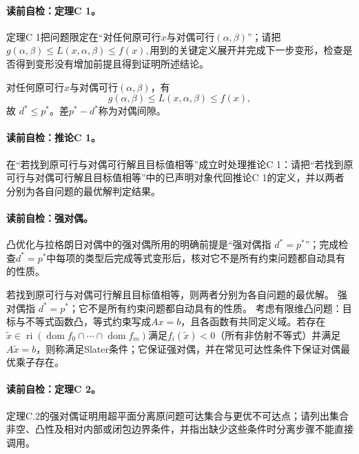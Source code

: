 \paragraph{读前自检：定理C 1。}定理C 1把问题限定在“对任何原可行$x$与对偶可行$(\alpha,\beta)$”；请把$g(\alpha,\beta)\le L(x,\alpha,\beta)\le f(x),$用到的关键定义展开并完成下一步变形，检查是否得到变形没有增加前提且得到证明所述结论。\par

对任何原可行$x$与对偶可行$(\alpha,\beta)$，有
\[
g(\alpha,\beta)\le L(x,\alpha,\beta)\le f(x),
\]
故 $d^*\le p^*$。差$p^*-d^*$称为对偶间隙。

\paragraph{读前自检：推论C 1。}在“若找到原可行与对偶可行解且目标值相等”成立时处理推论C 1：请把“若找到原可行与对偶可行解且目标值相等”中的已声明对象代回推论C 1的定义，并以两者分别为各自问题的最优解判定结果。\par
\paragraph{读前自检：强对偶。}凸优化与拉格朗日对偶中的强对偶所用的明确前提是“强对偶指 $d^*=p^*$”；完成检查$d^*=p^*$中每项的类型后完成等式变形后，核对它不是所有约束问题都自动具有的性质。\par

若找到原可行与对偶可行解且目标值相等，则两者分别为各自问题的最优解。
强对偶指 $d^*=p^*$；它不是所有约束问题都自动具有的性质。
考虑有限维凸问题：目标与不等式函数凸，等式约束写成$Ax=b$，且各函数有共同定义域。若存在$\widetilde x\in\operatorname{ri}(\operatorname{dom}f_0\cap\cdots\cap\operatorname{dom}f_m)$满足$f_i(\widetilde x)<0$（所有非仿射不等式）并满足$A\widetilde x=b$，则称满足Slater条件；它保证强对偶，并在常见可达性条件下保证对偶最优乘子存在。

\paragraph{读前自检：定理C 2。}定理C.2的强对偶证明用超平面分离原问题可达集合与更优不可达点；请列出集合非空、凸性及相对内部或闭包边界条件，并指出缺少这些条件时分离步骤不能直接调用。\par

